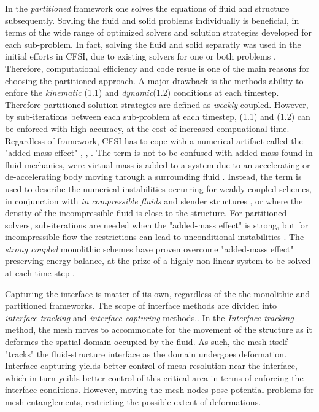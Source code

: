 In the \textit{partitioned} framework one solves the equations of fluid and structure subsequently. Sovling the fluid and solid problems individually is beneficial, in terms of the wide range of optimized solvers and solution strategies developed for each sub-problem. In fact, solving the fluid and solid separatly was used in the initial efforts in CFSI, due to existing solvers for one or both problems \cite{Gatzhammer2014}. Therefore, computational efficiency and code resue is one of the main reasons for choosing the partitioned approach. A major drawback is the methods ability to enfore the \textit{kinematic} (1.1) and \textit{dynamic}(1.2) conditions at each timestep. Therefore partitioned solution strategies are defined as  \textit{weakly} coupled. However, by sub-iterations between each sub-problem at each timestep, (1.1) and (1.2) can be enforced with high accuracy, at the cost of increased compuational time.  \\

Regardless of framework, CFSI has to cope with a numerical artifact called the "added-mass effect" \cite{Fernandez2007}, \cite{Fernandez2009}, \cite{Forster2007}. The term is not to be confused with added mass found in fluid mechanics, were virtual mass is added to a system due to an accelerating or de-accelerating body moving through a surrounding fluid \cite{Newman1977}. Instead, the term is used to describe the numerical instabilities occurring for weakly coupled schemes, in conjunction with \textit{in compressible fluids} and slender structures \cite{Forster2007}, or where the density of the incompressible fluid is close to the structure. For partitioned solvers, sub-iterations are needed when the "added-mass effect" is strong, but for incompressible flow the restrictions  can lead to unconditional instabilities \cite{Gatzhammer2014}. The \textit{strong coupled} monolithic schemes have proven overcome "added-mass effect" preserving energy balance, at the prize of a highly non-linear system to be solved at each time step \cite{Fernandez2007}.


Capturing the interface is matter of its own, regardless of the the monolithic and partitioned frameworks.
The scope of interface methods are divided into \textit{interface-tracking} and \textit{interface-capturing } methods.\cite{Frei2016}. In the \textit{Interface-tracking} method, the mesh moves to accommodate for the movement of the structure as it deformes the spatial domain occupied by the fluid. As such, the mesh itself "tracks" the fluid-structure interface as the domain undergoes deformation. Interface-capturing yields better control of mesh resolution near the interface, which in turn yeilds better control of this critical area in terms of enforcing the interface conditions.
However, moving the mesh-nodes pose potential problems for mesh-entanglements, restricting the possible extent of deformations.  

